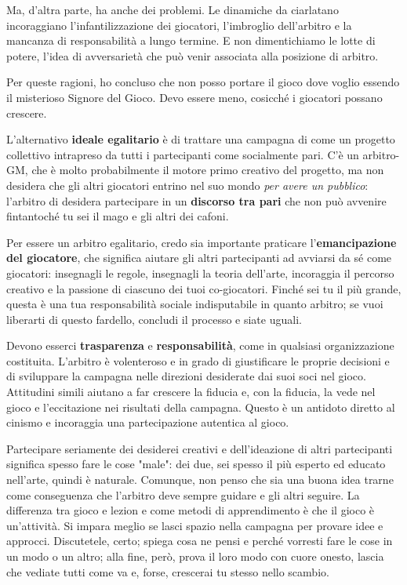 Ma, d'altra parte, ha anche dei problemi. Le dinamiche da ciarlatano incoraggiano l'infantilizzazione dei giocatori, l'imbroglio dell'arbitro e la mancanza di responsabilità a lungo termine. E non dimentichiamo le lotte di potere, l'idea di avversarietà che può venir associata alla posizione di arbitro.

Per queste ragioni, ho concluso che non posso portare il gioco dove voglio essendo il misterioso Signore del Gioco. Devo essere meno, cosicché i giocatori possano crescere.

L'alternativo \textbf{ideale egalitario} è di trattare una campagna di  come un progetto collettivo intrapreso da tutti i partecipanti come socialmente pari. C'è un arbitro-GM, che è molto probabilmente il motore primo creativo del progetto, ma non desidera che gli altri giocatori entrino nel suo mondo \textit{per avere un pubblico}: l'arbitro di  desidera partecipare in un \textbf{discorso tra pari} che non può avvenire fintantoché tu sei il mago e gli altri dei cafoni.

Per essere un arbitro egalitario, credo sia importante praticare l'\textbf{emancipazione del giocatore}, che significa aiutare gli altri partecipanti ad avviarsi da sé come giocatori: insegnagli le regole, insegnagli la teoria dell'arte, incoraggia il percorso creativo e la passione di ciascuno dei tuoi co-giocatori. Finché sei tu il più grande, questa è una tua responsabilità sociale indisputabile in quanto arbitro; se vuoi liberarti di questo fardello, concludi il processo e siate uguali.

Devono esserci \textbf{trasparenza} e \textbf{responsabilità}, come in qualsiasi organizzazione costituita. L'arbitro è volenteroso e in grado di giustificare le proprie decisioni e di sviluppare la campagna nelle direzioni desiderate dai suoi soci nel gioco. Attitudini simili aiutano a far crescere la fiducia e, con la fiducia, la vede nel gioco e l'eccitazione nei risultati della campagna. Questo è un antidoto diretto al cinismo e incoraggia una partecipazione autentica al gioco.

Partecipare seriamente dei desiderei creativi e dell'ideazione di altri partecipanti significa spesso fare le cose "male": dei due, sei spesso il più esperto ed educato nell'arte, quindi è naturale. Comunque, non penso che sia una buona idea trarne come conseguenza che l'arbitro deve sempre guidare e gli altri seguire. La differenza tra gioco e lezion e come metodi di apprendimento è che il gioco è un'attività. Si impara meglio se lasci spazio nella campagna per provare idee e approcci. Discutetele, certo; spiega cosa ne pensi e perché vorresti fare le cose in un modo o un altro; alla fine, però, prova il loro modo con cuore onesto, lascia che vediate tutti come va e, forse, crescerai tu stesso nello scambio.

